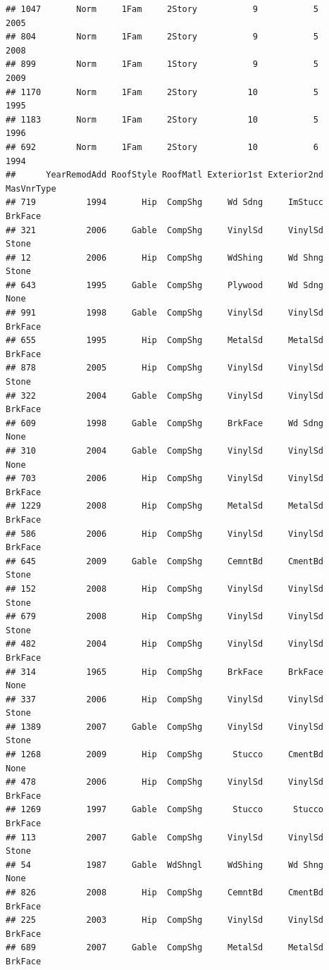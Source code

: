 \documentclass[]{article}
\begin{document}
\begin{verbatim}
## 1047       Norm     1Fam     2Story           9           5      2005
## 804        Norm     1Fam     2Story           9           5      2008
## 899        Norm     1Fam     1Story           9           5      2009
## 1170       Norm     1Fam     2Story          10           5      1995
## 1183       Norm     1Fam     2Story          10           5      1996
## 692        Norm     1Fam     2Story          10           6      1994
##      YearRemodAdd RoofStyle RoofMatl Exterior1st Exterior2nd MasVnrType
## 719          1994       Hip  CompShg     Wd Sdng     ImStucc    BrkFace
## 321          2006     Gable  CompShg     VinylSd     VinylSd      Stone
## 12           2006       Hip  CompShg     WdShing     Wd Shng      Stone
## 643          1995     Gable  CompShg     Plywood     Wd Sdng       None
## 991          1998     Gable  CompShg     VinylSd     VinylSd    BrkFace
## 655          1995       Hip  CompShg     MetalSd     MetalSd    BrkFace
## 878          2005       Hip  CompShg     VinylSd     VinylSd      Stone
## 322          2004     Gable  CompShg     VinylSd     VinylSd    BrkFace
## 609          1998     Gable  CompShg     BrkFace     Wd Sdng       None
## 310          2004     Gable  CompShg     VinylSd     VinylSd       None
## 703          2006       Hip  CompShg     VinylSd     VinylSd    BrkFace
## 1229         2008       Hip  CompShg     MetalSd     MetalSd    BrkFace
## 586          2006       Hip  CompShg     VinylSd     VinylSd    BrkFace
## 645          2009     Gable  CompShg     CemntBd     CmentBd      Stone
## 152          2008       Hip  CompShg     VinylSd     VinylSd      Stone
## 679          2008       Hip  CompShg     VinylSd     VinylSd      Stone
## 482          2004       Hip  CompShg     VinylSd     VinylSd    BrkFace
## 314          1965       Hip  CompShg     BrkFace     BrkFace       None
## 337          2006       Hip  CompShg     VinylSd     VinylSd      Stone
## 1389         2007     Gable  CompShg     VinylSd     VinylSd      Stone
## 1268         2009       Hip  CompShg      Stucco     CmentBd       None
## 478          2006       Hip  CompShg     VinylSd     VinylSd    BrkFace
## 1269         1997     Gable  CompShg      Stucco      Stucco    BrkFace
## 113          2007     Gable  CompShg     VinylSd     VinylSd      Stone
## 54           1987     Gable  WdShngl     WdShing     Wd Shng       None
## 826          2008       Hip  CompShg     CemntBd     CmentBd    BrkFace
## 225          2003       Hip  CompShg     VinylSd     VinylSd    BrkFace
## 689          2007     Gable  CompShg     MetalSd     MetalSd    BrkFace

\end{verbatim}
\end{document}
